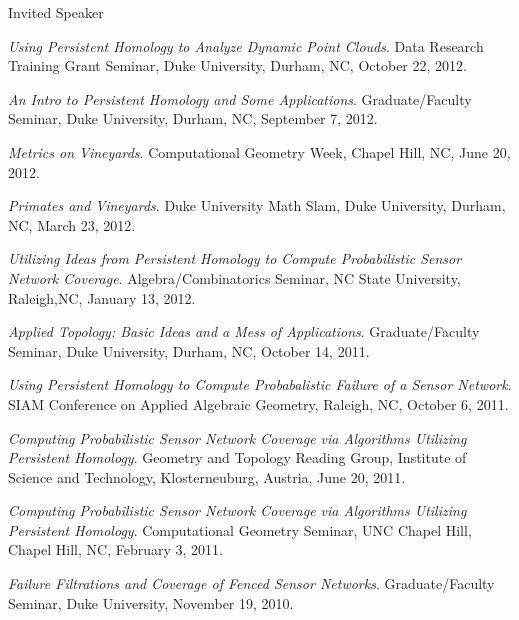\documentclass{resume} %
\begin{document}
\begin{rSection}{Invited Speaker}
\begin{etaremune}
\item\emph{Using Persistent Homology to Analyze Dynamic Point Clouds}. Data Research Training Grant Seminar, Duke University, Durham, NC, October 22, 2012. 

\item\emph{An Intro to Persistent Homology and Some Applications}. Graduate/Faculty Seminar, Duke University, Durham, NC, September 7, 2012. 

\item\emph{Metrics on Vineyards}. Computational Geometry Week, Chapel Hill, NC, June 20, 2012. 

\item\emph{Primates and Vineyards}. Duke University Math Slam, Duke University, Durham, NC, March 23, 2012. 

\item\emph{Utilizing Ideas from Persistent Homology to Compute Probabilistic Sensor Network Coverage}. Algebra/Combinatorics Seminar, NC State University, Raleigh,NC, January 13, 2012. 

\item\emph{Applied Topology: Basic Ideas and a Mess of Applications}. Graduate/Faculty Seminar, Duke University, Durham, NC, October 14, 2011. 

\item\emph{Using Persistent Homology to Compute Probabalistic Failure of a Sensor Network}. SIAM Conference on Applied Algebraic Geometry, Raleigh, NC, October 6, 2011. 

\item\emph{Computing Probabilistic Sensor Network Coverage via Algorithms Utilizing Persistent Homology}. Geometry and Topology Reading Group, Institute of Science and Technology, Klosterneuburg, Austria, June 20, 2011. 

\item\emph{Computing Probabilistic Sensor Network Coverage via Algorithms Utilizing Persistent Homology}. Computational Geometry Seminar, UNC Chapel Hill, Chapel Hill, NC, February 3, 2011. 

\item\emph{Failure Filtrations and Coverage of Fenced Sensor Networks}. Graduate/Faculty Seminar, Duke University, November 19, 2010. 

\end{etaremune}
\end{rSection}


%
\end{document}

